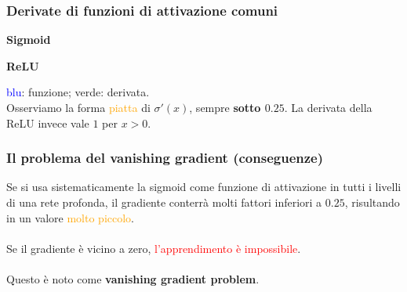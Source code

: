 \documentclass[a4paper,12pt]{article}
\newcommand{\hl}[1]{\textcolor{orange}{#1}}
\begin{document}
\subsubsection{Derivate di funzioni di attivazione comuni}
\begin{center}
\begin{minipage}[t]{0.48\linewidth}\centering
\textbf{Sigmoid}\\
\end{minipage}\hfill
\begin{minipage}[t]{0.48\linewidth}\centering
\textbf{ReLU}\\
\end{minipage}
\end{center}
{\small \textcolor{blue}{blu}: funzione; \textcolor{green!60!black}{verde}: derivata.}\\
Osserviamo la forma \hl{piatta} di $\sigma'(x)$, sempre \textbf{sotto $0.25$}. La derivata della ReLU invece vale $1$ per $x>0$.

\subsubsection{Il problema del vanishing gradient (conseguenze)}
Se si usa sistematicamente la sigmoid come funzione di attivazione in tutti i livelli di una rete profonda, il gradiente conterrà molti fattori inferiori a $0.25$, risultando in un valore \hl{molto piccolo}.\\
\vspace{1px}\\
Se il gradiente è vicino a zero, \textcolor{red}{l'apprendimento è impossibile}.\\
\vspace{1px}\\
Questo è noto come \textbf{vanishing gradient problem}.
\end{document}
